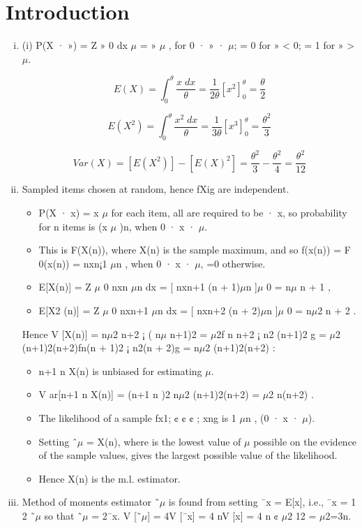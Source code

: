 \documentclass[a4paper,12pt]{article}
\begin{document}
\section{Introduction}
\begin{enumerate}[(i)]
\item (i) P(X · ») =
Z »
0
dx
$\mu$
= »
$\mu$
, for 0 · » · $\mu$; = 0 for » < 0; = 1 for » > $\mu$.

\[E(X) = \int^{\theta}_{0} \frac{x\;dx}{\theta} = \frac{1}{2\theta}\left[ x^2 \right]^{\theta}_{0} = \frac{\theta}{2}\]



\[E(X^2) = \int^{\theta}_{0} \frac{x^2\;dx}{\theta} = \frac{1}{3\theta}\left[ x^3 \right]^{\theta}_{0} = \frac{\theta^2}{3}\]

\[ Var(X) = [E(X^2)] - [E(X)^2] = \frac{\theta^2}{3} - \frac{\theta^2}{4} = \frac{\theta^2}{12}\]
\item Sampled items chosen at random, hence fXig are independent. 
\begin{itemize}
\item P(X · x) =
x
$\mu$ for each item, all are required to be · x, so probability for n items is (x
$\mu$ )n,
when 0 · x · $\mu$. 
\item This is F(X(n)), where X(n) is the sample maximum, and
so f(x(n)) = F
0(x(n)) = nxn¡1
$\mu$n , when 0 · x · $\mu$, =0 otherwise.
\item E[X(n)] =
Z $\mu$
0
nxn
$\mu$n dx = [ nxn+1
(n + 1)$\mu$n ]$\mu$
0 = n$\mu$
n + 1
,
\item E[X2
(n)] =
Z $\mu$
0
nxn+1
$\mu$n dx = [ nxn+2
(n + 2)$\mu$n ]$\mu$
0 = n$\mu$2
n + 2
.

\end{itemize}
Hence
V [X(n)] = n$\mu$2
n+2 ¡ ( n$\mu$
n+1)2 = $\mu$2f n
n+2 ¡ n2
(n+1)2 g
= $\mu$2
(n+1)2(n+2)fn(n + 1)2 ¡ n2(n + 2)g = n$\mu$2
(n+1)2(n+2) :
\begin{itemize}
\item n+1
n X(n) is unbiased for estimating $\mu$.
\item V ar[n+1
n X(n)] = (n+1
n )2 n$\mu$2
(n+1)2(n+2) = $\mu$2
n(n+2) .
\item The likelihood of a sample fx1; ¢ ¢ ¢ ; xng is 1
$\mu$n , (0 · x · $\mu$).
\item Setting ˆ$\mu$ = X(n), where is the lowest value of $\mu$ possible on the evidence of
the sample values, gives the largest possible value of the likelihood.
\item  Hence X(n) is the m.l. estimator.
\end{itemize}
\item Method of moments estimator ˜$\mu$ is found from setting ¯x = E[x], i.e., ¯x = 1
2
˜$\mu$
so that ˜$\mu$ = 2¯x. V [˜$\mu$] = 4V [¯x] = 4
nV [x] = 4
n ¢ $\mu$2
12 = $\mu$2=3n.


\end{enumerate}
\end{document}

